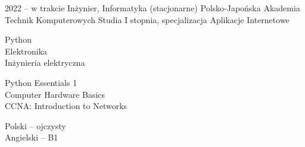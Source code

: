 \documentclass[9pt]{developercv}
\begin{document}


\begin{entrylist}
	\entry
		{2022 -- w trakcie}
		{Inżynier, Informatyka (stacjonarne)}
		{Polsko-Japońska Akademia Technik Komputerowych}
		{Studia I stopnia, specjalizacja Aplikacje Internetowe}
\end{entrylist}


\begin{minipage}[t]{0.3\textwidth}
	\vspace{-\baselineskip}
	
	Python\\
	Elektronika\\
	Inżynieria elektryczna
\end{minipage}\hfill
\begin{minipage}[t]{0.3\textwidth}
	\vspace{-\baselineskip}
	
	Python Essentials 1\\
	Computer Hardware Basics\\
	CCNA: Introduction to Networks
\end{minipage}\hfill
\begin{minipage}[t]{0.3\textwidth}
	\vspace{-\baselineskip}
	
	Polski – ojczysty\\
	Angielski – B1
\end{minipage}


\vfill
\end{document}

